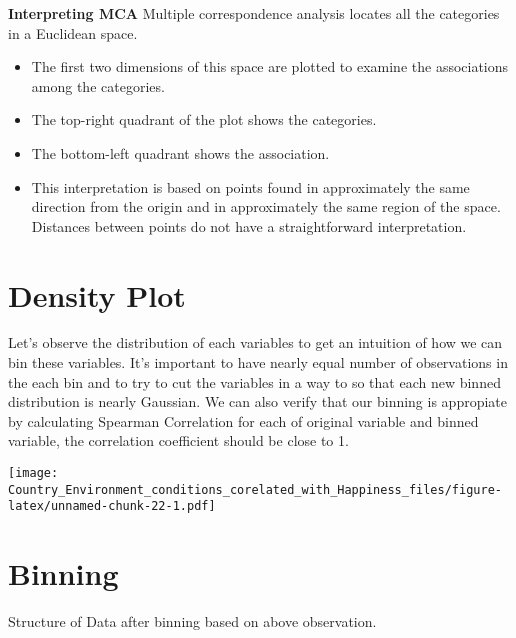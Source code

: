 \documentclass[]{book}
\providecommand{\tightlist}{%
  \setlength{\itemsep}{0pt}\setlength{\parskip}{0pt}}
\begin{document}
\textbf{Interpreting MCA} Multiple correspondence analysis locates all
the categories in a Euclidean space.

\begin{itemize}
\tightlist
\item
  The first two dimensions of this space are plotted to examine the
  associations among the categories.
\item
  The top-right quadrant of the plot shows the categories.
\item
  The bottom-left quadrant shows the association.
\item
  This interpretation is based on points found in approximately the same
  direction from the origin and in approximately the same region of the
  space. Distances between points do not have a straightforward
  interpretation.
\end{itemize}

\hypertarget{density-plot}{%
\section{Density Plot}\label{density-plot}}

Let's observe the distribution of each variables to get an intuition of
how we can bin these variables. It's important to have nearly equal
number of observations in the each bin and to try to cut the variables
in a way to so that each new binned distribution is nearly Gaussian. We
can also verify that our binning is appropiate by calculating Spearman
Correlation for each of original variable and binned variable, the
correlation coefficient should be close to 1.

\texttt{[image: Country\_Environment\_conditions\_corelated\_with\_Happiness\_files/figure-latex/unnamed-chunk-22-1.pdf]}

\hypertarget{binning}{%
\section{Binning}\label{binning}}

Structure of Data after binning based on above observation.
\end{document}

